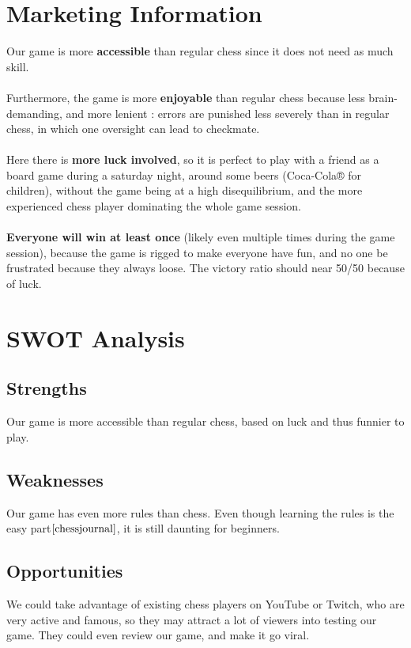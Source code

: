 \documentclass[12pt]{article}
\begin{document}
    \section{Marketing Information}
        Our game is more \textbf{accessible} than regular chess since it does not need as much skill.
        \\\\Furthermore, the game is more \textbf{enjoyable} than regular chess because less brain-demanding, and more lenient : errors are punished less severely than in regular chess, in which one oversight can lead to checkmate.
        \\\\Here there is \textbf{more luck involved}, so it is perfect to play with a friend as a board game during a saturday night, around some beers (Coca-Cola® for children), without the game being at a high disequilibrium, and the more experienced chess player dominating the whole game session.
        \\\\\textbf{Everyone will win at least once} (likely even multiple times during the game session), because the game is rigged to make everyone have fun, and no one be frustrated because they always loose. The victory ratio should near 50/50 because of luck.

    
    \section{SWOT Analysis}
        \subsection{Strengths}
            Our game is more accessible than regular chess, based on luck and thus funnier to play.
        \subsection{Weaknesses}
            Our game has even more rules than chess. Even though learning the rules is the easy part$\cite{chessjournal}$, it is still daunting for beginners.
        \subsection{Opportunities}
            We could take advantage of existing chess players on YouTube or Twitch, who are very active and famous, so they may attract a lot of viewers into testing our game. They could even review our game, and make it go viral.
\end{document}
